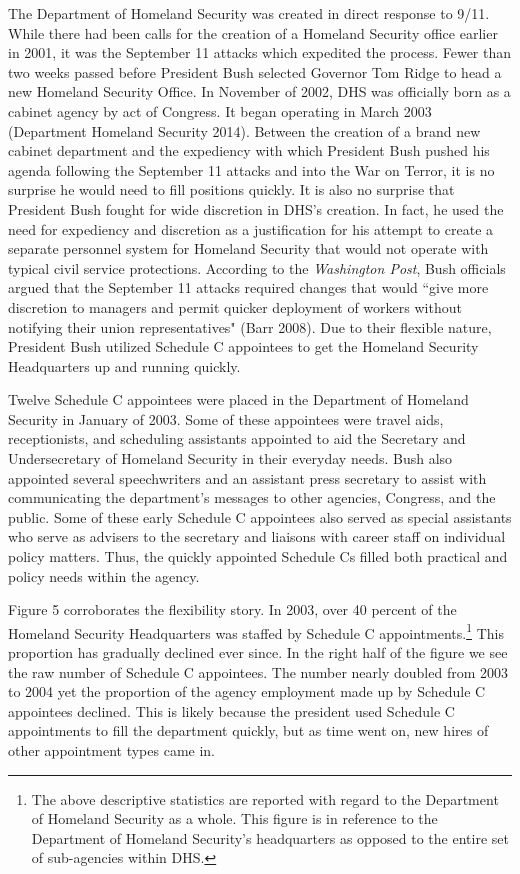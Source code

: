 \documentclass[12pt]{article}
\begin{document}
The Department of Homeland Security was created in direct response to 9/11. While there had been calls for the creation of a Homeland Security office earlier in 2001, it was the September 11 attacks which expedited the process. Fewer than two weeks passed before President Bush selected Governor Tom Ridge to head a new Homeland Security Office. In November of 2002, DHS was officially born as a cabinet agency by act of Congress. It began operating in March 2003 (Department Homeland Security 2014). Between the creation of a brand new cabinet department and the expediency with which President Bush pushed his agenda following the September 11 attacks and into the War on Terror, it is no surprise he would need to fill positions quickly. It is also no surprise that President Bush fought for wide discretion in DHS's creation. In fact, he used the need for expediency and discretion as a justification for his attempt to create a separate personnel system for Homeland Security that would not operate with typical civil service protections. According to the \textit{Washington Post}, Bush officials argued that the September 11 attacks required changes that would ``give more discretion to managers and permit quicker deployment of workers without notifying their union representatives" (Barr 2008). Due to their flexible nature, President Bush utilized Schedule C appointees to get the Homeland Security Headquarters up and running quickly.

Twelve Schedule C appointees were placed in the Department of Homeland Security in January of 2003. Some of these appointees were travel aids, receptionists, and scheduling assistants appointed to aid the Secretary and Undersecretary of Homeland Security in their everyday needs. Bush also appointed several speechwriters and an assistant press secretary to assist with communicating the department's messages to other agencies, Congress, and the public. Some of these early Schedule C appointees also served as special assistants who serve as advisers to the secretary and liaisons with career staff on individual policy matters. Thus, the quickly appointed Schedule Cs filled both practical and policy needs within the agency.

Figure 5 corroborates the flexibility story. In 2003, over 40 percent of the Homeland Security Headquarters was staffed by Schedule C appointments.\footnote{The above descriptive statistics are reported with regard to the Department of Homeland Security as a whole. This figure is in reference to the Department of Homeland Security's headquarters as opposed to the entire set of sub-agencies within DHS.} This proportion has gradually declined ever since. In the right half of the figure we see the raw number of Schedule C appointees. The number nearly doubled from 2003 to 2004 yet the proportion of the agency employment made up by Schedule C appointees declined. This is likely because the president used Schedule C appointments to fill the department quickly, but as time went on, new hires of other appointment types came in.
\end{document}
